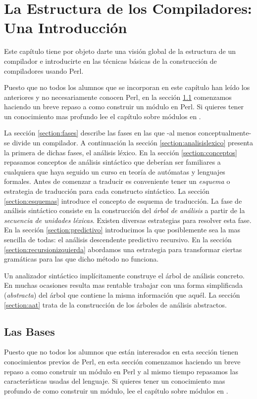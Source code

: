 \chapter{La Estructura de los Compiladores: Una Introducción}
\label{chapter:introcomp}
Este capítulo tiene por objeto darte una visión global de la 
estructura de un compilador e introducirte en las técnicas básicas
de la construcción de compiladores usando Perl.

Puesto que no todos los alumnos que se incorporan en este capítulo 
han leído los anteriores y no necesariamente conocen Perl, en la sección
\ref{section:lasbases}
comenzamos haciendo un breve repaso a como construir un módulo en Perl.
Si quieres tener un conocimiento mas profundo
lee el capítulo sobre módulos en 
. 

La sección 
\ref{section:fases}
describe las fases en las que -al menos conceptualmente-
se divide un compilador.
A continuación la sección 
\ref{section:analisislexico}
presenta la primera de dichas fases, el análisis léxico.
En la sección 
\ref{section:conceptos}
repasamos conceptos de análisis sintáctico 
que deberían ser familiares a cualquiera que haya 
seguido un curso en teoría de autómatas 
y lenguajes formales.
Antes de comenzar a traducir es conveniente tener un \emph{esquema} o estrategia
de traducción para cada constructo sintáctico. 
La sección 
\ref{section:esquemas}
introduce el concepto de esquema de traducción.
La fase de análisis sintáctico consiste en la construcción
del \emph{árbol de análisis} a partir de la \emph{secuencia de unidades léxicas}. 
Existen diversas estrategias para resolver esta fase.
En la sección 
\ref{section:predictivo}
introducimos la que posiblemente sea la mas sencilla de todas: el análisis
descendente predictivo recursivo.
En la sección
\ref{section:recursionizquierda}
abordamos una estrategia para transformar ciertas
gramáticas para las que dicho método no funciona.

Un analizador sintáctico implícitamente construye 
el árbol de análisis concreto. En muchas ocasiones
resulta mas rentable trabajar con una forma simplificada
(\emph{abstracta}) del árbol que contiene la misma información 
que aquél. La sección 
\ref{section:aat} trata de la construcción de los 
árboles de análisis abstractos.

\section{Las Bases}
\label{section:lasbases}
Puesto que no todos los alumnos que están interesados en esta sección
tienen conocimientos previos de Perl, en esta sección
comenzamos haciendo un breve repaso a como construir un módulo en Perl
y al mismo tiempo repasamos las características usadas del lenguaje.
Si quieres tener un conocimiento mas profundo
de como construir un módulo, lee el capítulo
sobre módulos en .

